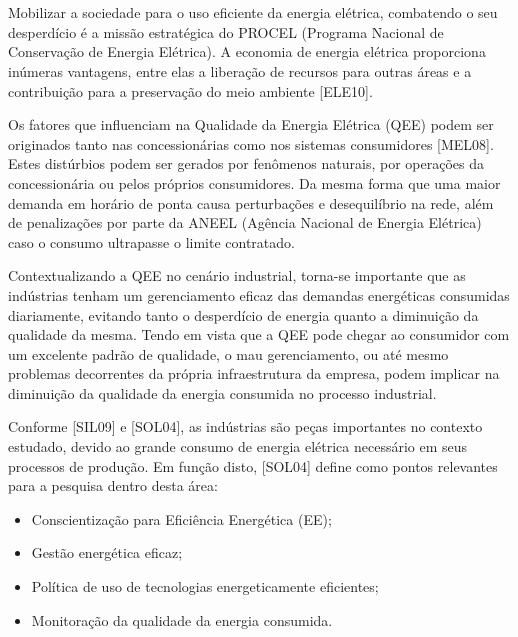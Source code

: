 \cleardoublepage
\pagestyle{fancy}
\setcounter{page}{9}
\chapter{\capum}\label{intro}
\par
{}
Mobilizar a sociedade para o uso eficiente da energia elétrica, combatendo o seu desperdício é a missão estratégica do PROCEL (Programa Nacional de Conservação de Energia Elétrica). A economia de energia elétrica proporciona inúmeras vantagens, entre elas a liberação de recursos para outras áreas e a contribuição para a preservação do meio ambiente [ELE10].
\par
Os fatores que influenciam na Qualidade da Energia Elétrica (QEE) podem ser originados tanto nas concessionárias como nos sistemas consumidores [MEL08]. Estes distúrbios podem ser gerados por fenômenos naturais, por operações da concessionária ou pelos próprios consumidores. Da mesma forma que uma maior demanda em horário de ponta causa perturbações e desequilíbrio na rede, além de penalizações por parte da ANEEL (Agência Nacional de Energia Elétrica) caso o consumo ultrapasse o limite contratado. 
\par
Contextualizando a QEE no cenário industrial, torna-se importante que as indústrias tenham um gerenciamento eficaz das demandas energéticas consumidas diariamente, evitando tanto o desperdício de energia quanto a diminuição da qualidade da mesma. Tendo em vista que a QEE pode chegar ao consumidor com um excelente padrão de qualidade, o mau gerenciamento, ou até mesmo problemas decorrentes da própria infraestrutura da empresa, podem implicar na diminuição da qualidade da energia consumida no processo industrial. 
\par
Conforme [SIL09] e [SOL04], as indústrias são peças importantes no contexto estudado, devido ao grande consumo de energia elétrica necessário em seus processos de produção. Em função disto, [SOL04] define como pontos relevantes para a pesquisa dentro desta área:
\begin{itemize}
	\item Conscientização para Eficiência Energética (EE);
	\item Gestão energética eficaz;
	\item Política de uso de tecnologias energeticamente eficientes;
	\item Monitoração da qualidade da energia consumida.
\end{itemize}
